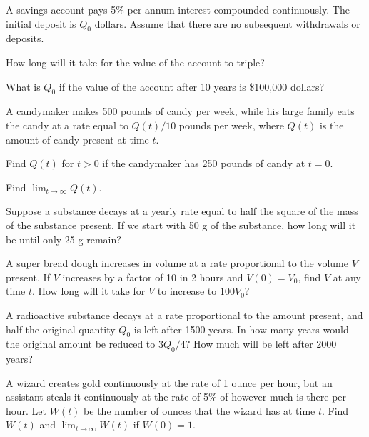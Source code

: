 \begin{exerciselist}
  \item\label{exer:4.1.10} A savings account pays 5\% per annum interest compounded continuously.
        The initial deposit is $Q_{0}$ dollars. Assume that there are no subsequent withdrawals or
        deposits.
  \begin{alist}
    \item %
    How long will it take for the value of the account to triple?

    \item %
    What is $Q_{0}$ if the value of the account after 10 years is \$100,000 dollars?
  \end{alist}

  \item\label{exer:4.1.11} A candymaker makes 500 pounds of candy per week, while his large family
        eats the candy at a rate equal to $Q(t)/10$ pounds per week, where $Q(t)$ is the amount of
        candy present at time $t$.
  \begin{alist}
    \item %
    Find $Q(t)$ for $t>0$ if the candymaker has 250 pounds of candy at $t=0$.

    \item %
    Find $\lim_{t\to\infty}Q(t)$.
  \end{alist}

  \item\label{exer:4.1.12} Suppose a substance decays at a yearly rate equal to half the square of
        the mass of the substance present. If we start with 50 g of the substance, how long will it
        be until only 25 g remain?

  \item\label{exer:4.1.13} A super bread dough increases in volume at a rate proportional to the
        volume $V$ present. If $V$ increases by a factor of 10 in 2 hours and $V(0)=V_{0}$, find $V$
        at any time $t$. How long will it take for $V$ to increase to $100 V_{0}$?

  \item\label{exer:4.1.14} A radioactive substance decays at a rate proportional to the amount
        present, and half the original quantity $Q_{0}$ is left after 1500 years. In how many years
        would the original amount be reduced to $3Q_{0}/4$? How much will be left after 2000 years?

  \item\label{exer:4.1.15} A wizard creates gold continuously at the rate of 1 ounce per hour, but
        an assistant steals it continuously at the rate of 5\% of however much is there per hour.
        Let $W(t)$ be the number of ounces that the wizard has at time $t$. Find $W(t)$ and
        $\lim_{t\to\infty}W(t)$ if $W(0)=1$.


\end{exerciselist}
